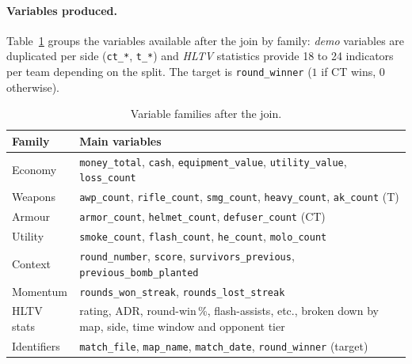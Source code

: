 \vspace{-0.6em}

\paragraph{Variables produced.}
Table~\ref{tab:features} groups the variables available after the
join by family: \emph{demo} variables are duplicated per side
(\texttt{ct\_*}, \texttt{t\_*}) and \emph{HLTV} statistics provide
18 to 24 indicators per team depending on the split. The target is
\texttt{round\_winner} ($1$ if CT wins, $0$ otherwise).

\begin{table}[H]
\centering
\footnotesize
\begin{tabular}{@{}lp{10.5cm}@{}}
\toprule
\textbf{Family} & \textbf{Main variables} \\
\midrule
Economy     & \texttt{money\_total}, \texttt{cash}, \texttt{equipment\_value},
              \texttt{utility\_value}, \texttt{loss\_count} \\
Weapons     & \texttt{awp\_count}, \texttt{rifle\_count}, \texttt{smg\_count},
              \texttt{heavy\_count}, \texttt{ak\_count} (T) \\
Armour      & \texttt{armor\_count}, \texttt{helmet\_count},
              \texttt{defuser\_count} (CT) \\
Utility     & \texttt{smoke\_count}, \texttt{flash\_count},
              \texttt{he\_count}, \texttt{molo\_count} \\
Context     & \texttt{round\_number}, \texttt{score},
              \texttt{survivors\_previous}, \texttt{previous\_bomb\_planted} \\
Momentum    & \texttt{rounds\_won\_streak}, \texttt{rounds\_lost\_streak} \\
HLTV stats  & rating, ADR, round-win\,\%, flash-assists, etc., broken
              down by map, side, time window and opponent tier \\
Identifiers & \texttt{match\_file}, \texttt{map\_name}, \texttt{match\_date},
              \texttt{round\_winner} (target) \\
\bottomrule
\end{tabular}
\caption{Variable families after the join.}
\label{tab:features}
\end{table}
